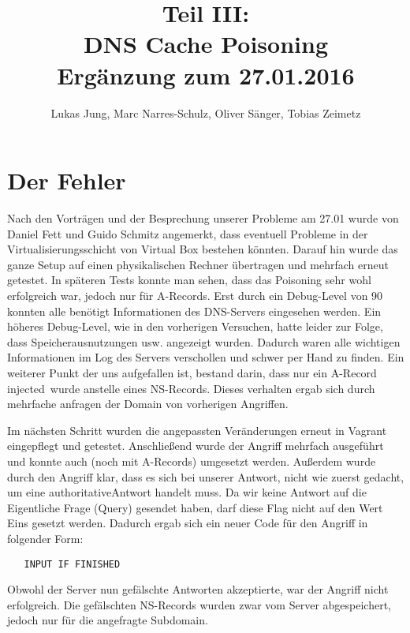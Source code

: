 \documentclass[10pt,a4paper]{article}
\author{Lukas Jung, Marc Narres-Schulz, Oliver Sänger, Tobias Zeimetz}
\title{Teil III: \\DNS Cache Poisoning \\Ergänzung zum 27.01.2016}
\begin{document}
\maketitle
\newpage

\section{Der Fehler}
Nach den Vorträgen und der Besprechung unserer Probleme am 27.01 wurde von Daniel Fett und Guido Schmitz angemerkt, dass eventuell Probleme in der Virtualisierungsschicht von Virtual Box bestehen könnten. Darauf hin wurde das ganze Setup auf einen physikalischen Rechner übertragen und mehrfach erneut getestet. In späteren Tests konnte man sehen, dass das Poisoning sehr wohl erfolgreich war, jedoch nur für A-Records. Erst durch ein Debug-Level von 90 konnten alle benötigt Informationen des DNS-Servers eingesehen werden. Ein höheres Debug-Level, wie in den vorherigen Versuchen, hatte leider zur Folge, dass Speicherausnutzungen usw. angezeigt wurden. Dadurch waren alle wichtigen Informationen im Log des Servers verschollen und schwer per Hand zu finden. Ein weiterer Punkt der uns aufgefallen ist, bestand darin, dass nur ein A-Record \glqq injected\grqq\ wurde anstelle eines NS-Records. Dieses verhalten ergab sich durch mehrfache anfragen der Domain von vorherigen Angriffen. 

Im nächsten Schritt wurden die angepassten Veränderungen erneut in Vagrant eingepflegt und getestet. Anschließend wurde der Angriff mehrfach ausgeführt und konnte auch (noch mit A-Records) umgesetzt werden. Außerdem wurde durch den Angriff klar, dass es sich bei unserer Antwort, nicht wie zuerst gedacht, um eine \glqq authoritative\grqq Antwort handelt muss. Da wir keine Antwort auf die Eigentliche Frage (Query) gesendet haben, darf diese Flag nicht auf den Wert Eins gesetzt werden. Dadurch ergab sich ein neuer Code für den Angriff in folgender Form:
\begin{center}
\begin{lstlisting}
   INPUT IF FINISHED
\end{lstlisting}
\end{center}

Obwohl der Server nun gefälschte Antworten akzeptierte, war der Angriff nicht erfolgreich. Die gefälschten NS-Records wurden zwar vom Server abgespeichert, jedoch nur für die angefragte Subdomain. 
\end{document}
